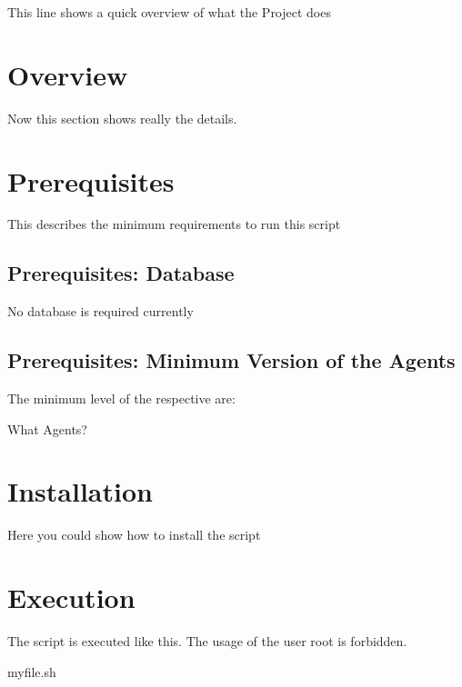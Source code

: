 This line shows a quick overview of what the Project does\hypertarget{index_secoverview}{}\section{Overview}\label{index_secoverview}
Now this section shows really the details. \hypertarget{index_secprerequisites}{}\section{Prerequisites}\label{index_secprerequisites}
This describes the minimum requirements to run this script \hypertarget{index_subsecdatabase}{}\subsection{Prerequisites\+: Database}\label{index_subsecdatabase}

\begin{DoxyItemize}
\item No database is required currently 
\end{DoxyItemize}\hypertarget{index_subsecagentversions}{}\subsection{Prerequisites\+: Minimum Version of the Agents}\label{index_subsecagentversions}
The minimum level of the respective are\+:
\begin{DoxyItemize}
\item What Agents? 
\end{DoxyItemize}\hypertarget{index_secintro}{}\section{Installation}\label{index_secintro}
Here you could show how to install the script \hypertarget{index_secexecution}{}\section{Execution}\label{index_secexecution}
The script is executed like this. The usage of the user root is forbidden. 
\begin{DoxyCode}
myfile.sh
\end{DoxyCode}
 